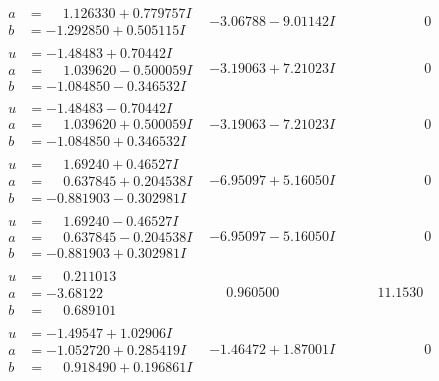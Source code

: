 \documentclass[1p]{elsarticle_modified}
\theoremstyle{definition}
\begin{document}
$$\begin{array}{c|c|c}
\begin{aligned}
a &= \phantom{-}1.126330 + 0.779757 I \\
b &= -1.292850 + 0.505115 I\end{aligned}
 & -3.06788 - 9.01142 I & \phantom{-0.000000 } 0 \\ \hline\begin{aligned}
u &= -1.48483 + 0.70442 I \\
a &= \phantom{-}1.039620 - 0.500059 I \\
b &= -1.084850 - 0.346532 I\end{aligned}
 & -3.19063 + 7.21023 I & \phantom{-0.000000 } 0 \\ \hline\begin{aligned}
u &= -1.48483 - 0.70442 I \\
a &= \phantom{-}1.039620 + 0.500059 I \\
b &= -1.084850 + 0.346532 I\end{aligned}
 & -3.19063 - 7.21023 I & \phantom{-0.000000 } 0 \\ \hline\begin{aligned}
u &= \phantom{-}1.69240 + 0.46527 I \\
a &= \phantom{-}0.637845 + 0.204538 I \\
b &= -0.881903 - 0.302981 I\end{aligned}
 & -6.95097 + 5.16050 I & \phantom{-0.000000 } 0 \\ \hline\begin{aligned}
u &= \phantom{-}1.69240 - 0.46527 I \\
a &= \phantom{-}0.637845 - 0.204538 I \\
b &= -0.881903 + 0.302981 I\end{aligned}
 & -6.95097 - 5.16050 I & \phantom{-0.000000 } 0 \\ \hline\begin{aligned}
u &= \phantom{-}0.211013\phantom{ +0.000000I} \\
a &= -3.68122\phantom{ +0.000000I} \\
b &= \phantom{-}0.689101\phantom{ +0.000000I}\end{aligned}
 & \phantom{-}0.960500\phantom{ +0.000000I} & \phantom{-}11.1530\phantom{ +0.000000I} \\ \hline\begin{aligned}
u &= -1.49547 + 1.02906 I \\
a &= -1.052720 + 0.285419 I \\
b &= \phantom{-}0.918490 + 0.196861 I\end{aligned}
 & -1.46472 + 1.87001 I & \phantom{-0.000000 } 0 \\ \hline\begin{aligned}

\end{aligned}
\end{array}$$
\end{document}
